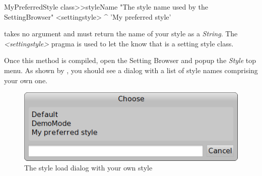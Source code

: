\documentclass[a4paper,10pt,twoside]{book}
\begin{document}
{\begin{code}{}
MyPreferredStyle class>>styleName
	"The style name used by the SettingBrowser"
	<settingstyle>
	^ 'My preferred style'
\end{code}

 takes no argument and must return the name of your style as a \textit{String}. The \textit{<settingstyle>} pragma is used to let the \setbrowser know that  is a setting style class.

Once this method is compiled, open the Setting Browser and popup the \textit{Style} top menu. As shown by , you should see a dialog with a list of style names comprising your own one.

\begin{figure}[tbh]
\begin{center}
\includegraphics[scale=0.4]{setting-style-load-dialog}
\caption{The style load dialog with your own style}
\end{center}
\end{figure}



}
\end{document}
